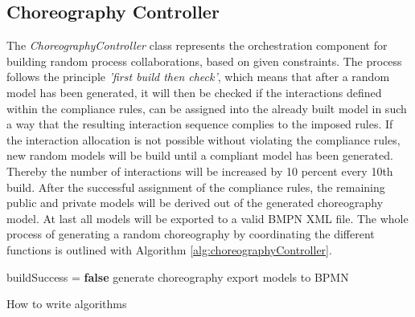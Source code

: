 \subsection{Choreography Controller}
The \textit{ChoreographyController} class represents the orchestration component for building random process collaborations, based on given constraints. The process follows the principle \textit{'first build then check'}, which means that after a random model has been generated, it will then be checked if the interactions defined within the compliance rules, can be assigned into the already built model in such a way that the resulting interaction sequence complies to the imposed rules. If the interaction allocation is not possible without violating the compliance rules, new random models will be build until a compliant model has been generated. Thereby the number of interactions will be increased by 10 percent every 10th build. After the successful assignment of the compliance rules, the remaining public and private models will be derived out of the generated choreography model. At last all models will be exported to a valid BMPN XML file. The whole process of generating a random choreography by coordinating the different functions is outlined with Algorithm \ref{alg:choreographyController}. \\

\begin{algorithm}[H]
\SetAlgoLined
\KwData{}
\KwResult{}
buildSuccess = \textbf{false}\;
generate choreography\;
export models to BPMN\;
\caption{How to write algorithms}
\label{alg:choreographyController}
\end{algorithm}


